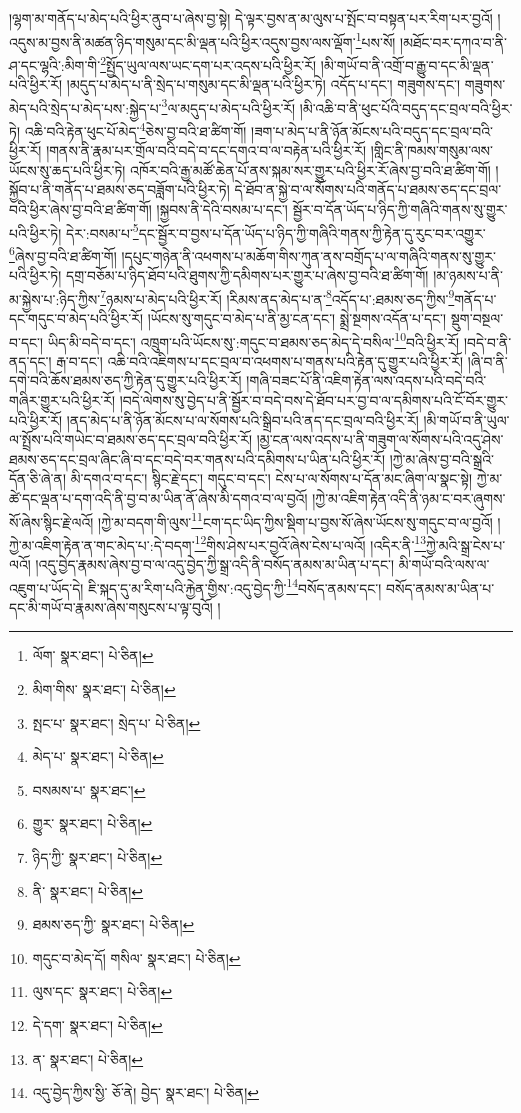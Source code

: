 །ལྷག་མ་གནོད་པ་མེད་པའི་ཕྱིར་ནུབ་པ་ཞེས་བྱ་སྟེ། དེ་ལྟར་བྱས་ན་མ་ལུས་པ་སྤོང་བ་བསྟན་པར་རིག་པར་བྱའོ། །འདུས་མ་བྱས་ནི་མཚན་ཉིད་གསུམ་དང་མི་ལྡན་པའི་ཕྱིར་འདུས་བྱས་ལས་ལྡོག་\footnote{ལོག་  སྣར་ཐང་།  པེ་ཅིན། }པས་སོ། །མཐོང་བར་དཀའ་བ་ནི་ཤ་དང་ལྷའི་:མིག་གི་\footnote{མིག་གིས་  སྣར་ཐང་།  པེ་ཅིན། }སྤྱོད་ཡུལ་ལས་ཡང་དག་པར་འདས་པའི་ཕྱིར་རོ། །མི་གཡོ་བ་ནི་འགྲོ་བ་རྒྱུ་བ་དང་མི་ལྡན་པའི་ཕྱིར་རོ། །མདུད་པ་མེད་པ་ནི་སྲེད་པ་གསུམ་དང་མི་ལྡན་པའི་ཕྱིར་ཏེ། འདོད་པ་དང་། གཟུགས་དང་། གཟུགས་མེད་པའི་སྲེད་པ་མེད་པས་:སྐྱེད་པ་\footnote{སྤང་པ་  སྣར་ཐང་། སྲེད་པ་  པེ་ཅིན། }ལ་མདུད་པ་མེད་པའི་ཕྱིར་རོ། །མི་འཆི་བ་ནི་ཕུང་པོའི་བདུད་དང་བྲལ་བའི་ཕྱིར་ཏེ། འཆི་བའི་རྟེན་ཕུང་པོ་མེད་\footnote{མེད་པ་  སྣར་ཐང་།  པེ་ཅིན། }ཅེས་བྱ་བའི་ཐ་ཚིག་གོ། །ཟག་པ་མེད་པ་ནི་ཉོན་མོངས་པའི་བདུད་དང་བྲལ་བའི་ཕྱིར་རོ། །གནས་ནི་རྣམ་པར་གྲོལ་བའི་བདེ་བ་དང་དགའ་བ་ལ་བརྟེན་པའི་ཕྱིར་རོ། །གླིང་ནི་ཁམས་གསུམ་ལས་ཡོངས་སུ་ཆད་པའི་ཕྱིར་ཏེ། འཁོར་བའི་རྒྱ་མཚོ་ཆེན་པོ་ནས་སྐམ་སར་གྱུར་པའི་ཕྱིར་རོ་ཞེས་བྱ་བའི་ཐ་ཚིག་གོ། །སྐྱོབ་པ་ནི་གནོད་པ་ཐམས་ཅད་བཟློག་པའི་ཕྱིར་ཏེ། དེ་ཐོབ་ན་སྐྱེ་བ་ལ་སོགས་པའི་གནོད་པ་ཐམས་ཅད་དང་བྲལ་བའི་ཕྱིར་ཞེས་བྱ་བའི་ཐ་ཚིག་གོ། །སྐྱབས་ནི་དེའི་བསམ་པ་དང་། སྦྱོར་བ་དོན་ཡོད་པ་ཉིད་ཀྱི་གཞིའི་གནས་སུ་གྱུར་པའི་ཕྱིར་ཏེ། དེར་:བསམ་པ་\footnote{བསམས་པ་  སྣར་ཐང་། }དང་སྦྱོར་བ་བྱས་པ་དོན་ཡོད་པ་ཉིད་ཀྱི་གཞིའི་གནས་ཀྱི་རྟེན་དུ་རུང་བར་འགྱུར་\footnote{གྱུར་  སྣར་ཐང་།  པེ་ཅིན། }ཞེས་བྱ་བའི་ཐ་ཚིག་གོ། །དཔུང་གཉེན་ནི་འཕགས་པ་མཆོག་གིས་ཀུན་ནས་བགྲོད་པ་ལ་གཞིའི་གནས་སུ་གྱུར་པའི་ཕྱིར་ཏེ། དགྲ་བཅོམ་པ་ཉིད་ཐོབ་པའི་ཐུགས་ཀྱི་དམིགས་པར་གྱུར་པ་ཞེས་བྱ་བའི་ཐ་ཚིག་གོ། །མ་ཉམས་པ་ནི་མ་སྐྱེས་པ་:ཉིད་ཀྱིས་\footnote{ཉིད་ཀྱི་  སྣར་ཐང་།  པེ་ཅིན། }ཉམས་པ་མེད་པའི་ཕྱིར་རོ། །རིམས་ནད་མེད་པ་ན་\footnote{ནི་  སྣར་ཐང་།  པེ་ཅིན། }འདོད་པ་:ཐམས་ཅད་ཀྱིས་\footnote{ཐམས་ཅད་ཀྱི་  སྣར་ཐང་།  པེ་ཅིན། }གནོད་པ་དང་གདུང་བ་མེད་པའི་ཕྱིར་རོ། །ཡོངས་སུ་གདུང་བ་མེད་པ་ནི་མྱ་ངན་དང་། སྨྲེ་སྔགས་འདོན་པ་དང་། སྡུག་བསྔལ་བ་དང་། ཡིད་མི་བདེ་བ་དང་། འཁྲུག་པའི་ཡོངས་སུ་:གདུང་བ་ཐམས་ཅད་མེད་དེ་བསིལ་\footnote{གདུང་བ་མེད་དོ། གསིལ་  སྣར་ཐང་།  པེ་ཅིན། }བའི་ཕྱིར་རོ། །བདེ་བ་ནི་ནད་དང་། རྒ་བ་དང་། འཆི་བའི་འཇིགས་པ་དང་བྲལ་བ་འཕགས་པ་གནས་པའི་རྟེན་དུ་གྱུར་པའི་ཕྱིར་རོ། །ཞི་བ་ནི་དགེ་བའི་ཆོས་ཐམས་ཅད་ཀྱི་རྟེན་དུ་གྱུར་པའི་ཕྱིར་རོ། །གཞི་བཟང་པོ་ནི་འཇིག་རྟེན་ལས་འདས་པའི་བདེ་བའི་གཞིར་གྱུར་པའི་ཕྱིར་རོ། །བདེ་ལེགས་སུ་བྱེད་པ་ནི་སྦྱོར་བ་བདེ་བས་དེ་ཐོབ་པར་བྱ་བ་ལ་དམིགས་པའི་ངོ་བོར་གྱུར་པའི་ཕྱིར་རོ། །ནད་མེད་པ་ནི་ཉོན་མོངས་པ་ལ་སོགས་པའི་སྒྲིབ་པའི་ནད་དང་བྲལ་བའི་ཕྱིར་རོ། །མི་གཡོ་བ་ནི་ཡུལ་ལ་སྤྲོས་པའི་གཡེང་བ་ཐམས་ཅད་དང་བྲལ་བའི་ཕྱིར་རོ། །མྱ་ངན་ལས་འདས་པ་ནི་གཟུག་ལ་སོགས་པའི་འདུ་ཤེས་ཐམས་ཅད་དང་བྲལ་ཞིང་ཞི་བ་དང་བདེ་བར་གནས་པའི་དམིགས་པ་ཡིན་པའི་ཕྱིར་རོ། །ཀྱེ་མ་ཞེས་བྱ་བའི་སྒྲའི་དོན་ཅི་ཞེ་ན། མི་དགའ་བ་དང་། སྙིང་རྗེ་དང་། གདུང་བ་དང་། ངེས་པ་ལ་སོགས་པ་དོན་མང་ཞིག་ལ་སྣང་སྟེ། ཀྱེ་མ་ཚེ་དང་ལྡན་པ་དག་འདི་ནི་བྱ་བ་མ་ཡིན་ནོ་ཞེས་མི་དགའ་བ་ལ་བྱའོ། །ཀྱེ་མ་འཇིག་རྟེན་འདི་ནི་ཉམ་ང་བར་ཞུགས་སོ་ཞེས་སྙིང་རྗེ་ལའོ། །ཀྱེ་མ་བདག་གི་ལུས་\footnote{ལུས་དང་  སྣར་ཐང་།  པེ་ཅིན། }ངག་དང་ཡིད་ཀྱིས་སྡིག་པ་བྱས་སོ་ཞེས་ཡོངས་སུ་གདུང་བ་ལ་བྱའོ། །ཀྱེ་མ་འཇིག་རྟེན་ན་གང་མེད་པ་:དེ་བདག་\footnote{དེ་དག་  སྣར་ཐང་།  པེ་ཅིན། }གིས་ཤེས་པར་བྱའོ་ཞེས་ངེས་པ་ལའོ། །འདིར་ནི་\footnote{ན་  སྣར་ཐང་།  པེ་ཅིན། }ཀྱེ་མའི་སྒྲ་ངེས་པ་ལའོ། །འདུ་བྱེད་རྣམས་ཞེས་བྱ་བ་ལ་འདུ་བྱེད་ཀྱི་སྒྲ་འདི་ནི་བསོད་ནམས་མ་ཡིན་པ་དང་། མི་གཡོ་བའི་ལས་ལ་འཇུག་པ་ཡོད་དེ། ཇི་སྐད་དུ་མ་རིག་པའི་རྐྱེན་གྱིས་:འདུ་བྱེད་ཀྱི་\footnote{འདུ་བྱེད་ཀྱིས་ྱིས་  ཅོ་ནེ། བྱེད་  སྣར་ཐང་།  པེ་ཅིན། }བསོད་ནམས་དང་། བསོད་ནམས་མ་ཡིན་པ་དང་མི་གཡོ་བ་རྣམས་ཞེས་གསུངས་པ་ལྟ་བུའོ། །
